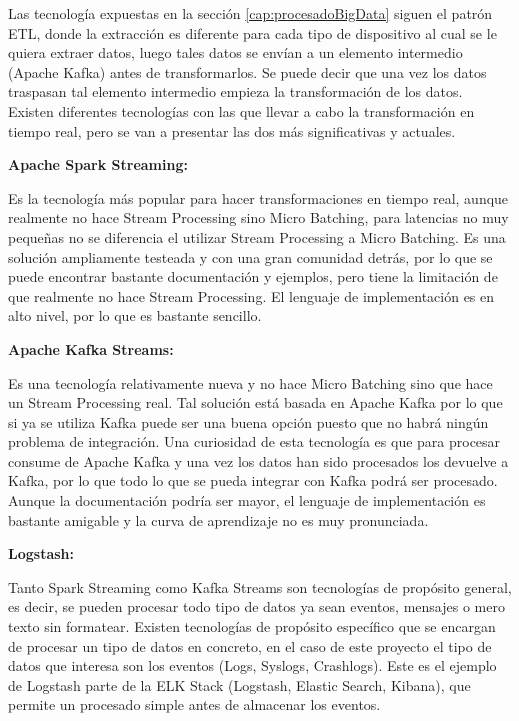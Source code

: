 Las tecnología expuestas en la sección \ref{cap:procesadoBigData} siguen el patrón ETL, donde la extracción es diferente para cada tipo de dispositivo al cual se le quiera extraer datos, luego tales datos se envían a un elemento intermedio (Apache Kafka) antes de transformarlos. Se puede decir que una vez los datos traspasan tal elemento intermedio empieza la transformación de los datos. Existen diferentes tecnologías con las que llevar a cabo la transformación en tiempo real, pero se van a presentar las dos más significativas y actuales.


\textbf{Apache Spark Streaming:}

Es la tecnología más popular para hacer transformaciones en tiempo real, aunque realmente no hace Stream Processing sino Micro Batching\cite{Tfg:microbatching}, para latencias no muy pequeñas no se diferencia el utilizar Stream Processing a Micro Batching. Es una solución ampliamente testeada y con una gran comunidad detrás, por lo que se puede encontrar bastante documentación y ejemplos, pero tiene la limitación de que realmente no hace Stream Processing. El lenguaje de implementación es en alto nivel, por lo que es bastante sencillo.

\textbf{Apache Kafka Streams:}

Es una tecnología relativamente nueva y no hace Micro Batching sino que hace un Stream Processing real. Tal solución está basada en Apache Kafka por lo que si ya se utiliza Kafka puede ser una buena opción puesto que no habrá ningún problema de integración. Una curiosidad de esta tecnología es que para procesar consume de Apache Kafka y una vez los datos han sido procesados los devuelve a Kafka, por lo que todo lo que se pueda integrar con Kafka podrá ser procesado. Aunque la documentación podría ser mayor, el lenguaje de implementación es bastante amigable y la curva de aprendizaje no es muy pronunciada.

\textbf{Logstash:}

Tanto Spark Streaming como Kafka Streams son tecnologías de propósito general, es decir, se pueden procesar todo tipo de datos ya sean eventos, mensajes o mero texto sin formatear. Existen tecnologías de propósito específico que se encargan de procesar un tipo de datos en concreto, en el caso de este proyecto el tipo de datos que interesa son los eventos (Logs, Syslogs, Crashlogs). Este es el ejemplo de Logstash parte de la ELK Stack (Logstash, Elastic Search, Kibana), que permite un procesado simple antes de almacenar los eventos.


